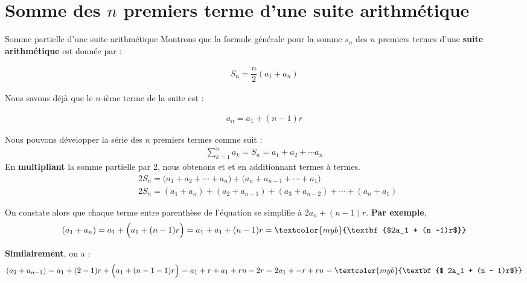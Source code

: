 \documentclass{report}
\begin{document}
    \section{Somme des $n$ premiers terme d'une suite \textcolor{myb}{\textbf{arithmétique}}}
    \begin{Preuve}{\hypertarget{Somme des n premiers termes arithmétique}{Somme partielle d'une suite arithmétique}}{}
        Montrons que la formule générale pour la somme $s_n$ des $n$ premiers 
        termes d'une \textbf{suite arithmétique} est donnée par : 

        \begin{align*}
            S_n = \dfrac{n}{2}(a_1 + a_n) 
        \end{align*}

        Nous savons déjà que le $n$-ième terme de la suite est : 

        \begin{align*}
            a_n = a_1 + (n - 1)r
        \end{align*}                    

        Nous pouvons développer la série des $n$ premiers termes comme suit : 
        \begin{align*}
        \sum\limits_{k=1}^{n }a_k = S_n = a_1 + a_2 + \cdots a_n 
        \end{align*}
        En \textbf{multipliant} la somme partielle par $2$, nous obtenons et 
        et en additionnant termes à termes.
        \begin{align*}
            &2S_n =
            \bigl(a_1 + a_2 + \cdots  + a_n \bigr) +
            \bigl( a_n + a_{n -1} + \cdots  + a_1 \bigr)
            \\
            &2S_n = (a_1 + a_n) + (a_2 + a_{n - 1}) + (a_3 + a_{n - 2}) + \cdots 
            + (a_n + a_1)
        \end{align*}

        On constate alors que chaque terme entre parenthèse de l'équation  
        se simplifie à $2a_n + (n - 1)r$. \textbf{Par exemple}, 
        \begin{align*}
            (a_1 + a_n) = a_1 + \Bigl(a_1 + (n - 1)r \Bigr) = 
            a_1 + a_1 + (n -1)r = \textcolor{myb}{\textbf{$2a_1 + (n -1)r$}}  
        \end{align*}

        \textbf{Similairement}, on a :
        \begin{align*}
            (a_2 + a_{n-1}) = a_1 + (2 - 1)r + \Bigl(a_1 + (n - 1 - 1)r \Bigr) = 
            a_1 +r + a_1 +rn -2r = 2a_1 + -r +rn =
            \textcolor{myb}{\textbf{$ 2a_1 + (n - 1)r$}} 
        \end{align*}


\end{Preuve}
\end{document}
